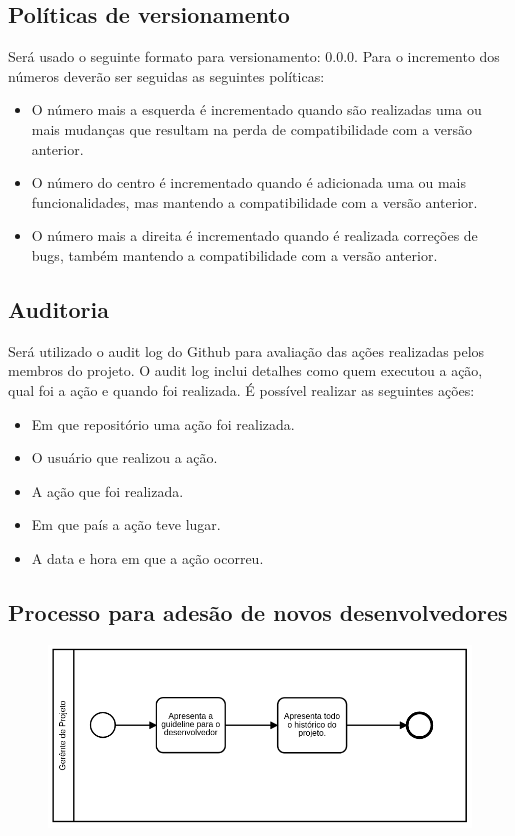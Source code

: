 \documentclass{article}
\begin{document}
        \subsection{Políticas de versionamento}
        Será usado o seguinte formato para versionamento: 0.0.0. Para o incremento dos números deverão ser seguidas as seguintes políticas:
        \begin{itemize}
        	\item O número mais a esquerda é incrementado quando são realizadas uma ou mais mudanças que resultam na perda de compatibilidade com a versão anterior.
			\item O número do centro é incrementado quando é adicionada uma ou mais funcionalidades, mas mantendo a compatibilidade com a versão anterior. 
			\item O número mais a direita é incrementado quando é realizada correções de bugs, também mantendo a compatibilidade com a versão anterior. 
		\end{itemize}
		\subsection{Auditoria}
			Será utilizado o audit log do Github para avaliação das ações realizadas pelos membros do projeto. O audit log inclui detalhes como quem executou a ação, qual foi a ação e quando foi realizada.
			\newline
			É possível realizar as seguintes ações:
			\begin{itemize}
				\item Em que repositório uma ação foi realizada.
				\item O usuário que realizou a ação.
				\item A ação que foi realizada.
				\item Em que país a ação teve lugar.
				\item A data e hora em que a ação ocorreu.
			\end{itemize}
        \subsection{Processo para adesão de novos desenvolvedores}
	        \begin{figure}[H]
	        	\centering
	        	\includegraphics[width=0.7\linewidth]{processo_adesao_novo_desenvolvedor}
	        	\caption{}
	        	\label{fig:processoadesaonovodesenvolvedor}
	        \end{figure}
	        
\end{document}
